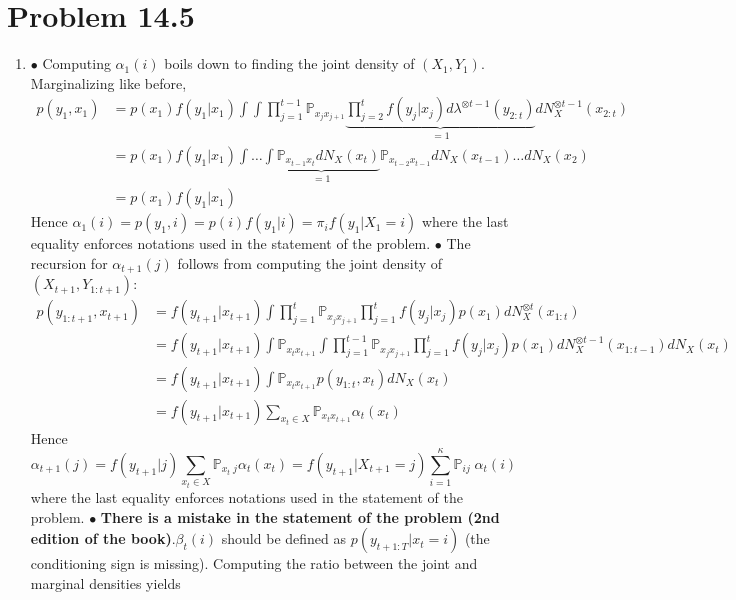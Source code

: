 \documentclass[a4paper,11pt, hidelinks]{article}
\begin{document}
\section*{Problem 14.5}
\begin{enumerate}[label=(\alph*)]
	\item $\bullet$ Computing $\alpha_1(i)$ boils down to finding the joint density of $(X_1,Y_1)$. Marginalizing like before, 
	$$\begin{aligned}p(y_1,x_1) &= p(x_1)f(y_1|x_1) \int \int \prod_{j=1}^{t-1}\mathbb P_{x_{j} x_{j+1}} \underbrace{\prod_{j=2}^{t}f(y_j|x_j)d\lambda^{\otimes t-1}(y_{2:t})}_{=1} dN_X^{\otimes t-1}(x_{2:t}) \\
	&= p(x_1)f(y_1|x_1) \int \ldots \underbrace{\int \mathbb P_{x_{t-1} x_{t}} dN_X(x_t)}_{=1} \mathbb P_{x_{t-2} x_{t-1}}dN_X(x_{t-1}) \ldots dN_X(x_{2})\\
	&= p(x_1)f(y_1|x_1)
	\end{aligned}
	$$
	Hence $\alpha_1(i) = p(y_1,i)=p(i)f(y_1|i)=\pi_i f(y_1|X_1 =i)$ where the last equality enforces notations used in the statement of the problem.
	\newline
	\newline
	$\bullet$ The recursion for $\alpha_{t+1}(j)$ follows from computing the joint density of $(X_{t+1}, Y_{1:t+1})$:
	$$\begin{aligned}
		p(y_{1:t+1}, x_{t+1}) &= f(y_{t+1}|x_{t+1})\int \prod_{j=1}^{t}\mathbb P_{x_{j} x_{j+1}} \prod_{j=1}^{t}f(y_j|x_j)p(x_1) dN_X^{\otimes t}(x_{1:t}) \\
		&= f(y_{t+1}|x_{t+1}) \int \mathbb P_{x_{t} x_{t+1}} \int \prod_{j=1}^{t-1}\mathbb P_{x_{j} x_{j+1}} \prod_{j=1}^{t}f(y_j|x_j)p(x_1) dN_X^{\otimes t-1}(x_{1:t-1}) dN_X(x_t)\\
		&= f(y_{t+1}|x_{t+1}) \int \mathbb P_{x_{t} x_{t+1}} p(y_{1:t}, x_{t}) dN_X(x_t)\\
		&= f(y_{t+1}|x_{t+1}) \sum_{x_t\in X} \mathbb P_{x_{t} x_{t+1}} \alpha_t(x_t)
	\end{aligned}$$
	Hence $$\alpha_{t+1}(j) = f(y_{t+1}|j) \sum_{x_t\in X} \mathbb P_{x_{t}\;j} \alpha_t(x_t) = f(y_{t+1}|X_{t+1} = j) \sum_{i=1}^\kappa \mathbb P_{ij} \;\alpha_t(i)$$ where the last equality enforces notations used in the statement of the problem.
	\newline
	\newline
	$\bullet$ \textbf{There is a mistake in the statement of the problem (2nd edition of the book)}.\newline $\beta_t(i)$ should be defined as $p(y_{t+1:T}|x_t=i)$ (the conditioning sign is missing). Computing the ratio between the joint and marginal densities yields 

\end{enumerate}
\end{document}
